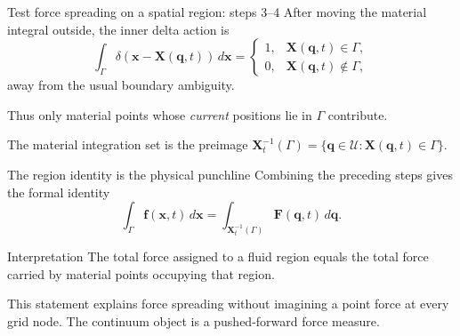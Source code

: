 \documentclass[aspectratio=169,11pt]{beamer}
\newcommand{\xvec}{\bm{x}}
\newcommand{\Xvec}{\bm{q}}
\newcommand{\chivec}{\bm{X}}
\newcommand{\fvec}{\bm{f}}
\newcommand{\Fvec}{\bm{F}}
\begin{document}
\begin{frame}{Test force spreading on a spatial region: steps 3--4}
After moving the material integral outside, the inner delta action is
\[
  \int_{\Gamma}\delta\!\left(\xvec-\chivec(\Xvec,t)\right)\,d\xvec
  =
  \begin{cases}
  1, & \chivec(\Xvec,t)\in\Gamma,\\
  0, & \chivec(\Xvec,t)\notin\Gamma,
  \end{cases}
\]
away from the usual boundary ambiguity.

\medskip
Thus only material points whose \emph{current} positions lie in \(\Gamma\) contribute.

\begin{punchbox}
The material integration set is the preimage
\(
\chivec_t^{-1}(\Gamma)
=\{\Xvec\in\mathcal U:\chivec(\Xvec,t)\in\Gamma\}.
\)
\end{punchbox}
\end{frame}

\begin{frame}{The region identity is the physical punchline}
Combining the preceding steps gives the formal identity
\[
  \boxed{
  \int_{\Gamma}\fvec(\xvec,t)\,d\xvec
  =
  \int_{\chivec_t^{-1}(\Gamma)}\Fvec(\Xvec,t)\,d\Xvec .}
\]

\begin{block}{Interpretation}
The total force assigned to a fluid region equals the total force carried by material points occupying that region.
\end{block}

\begin{punchbox}
This statement explains force spreading without imagining a point force at every grid node. The continuum object is a pushed-forward force measure.
\end{punchbox}
\end{frame}
\end{document}
